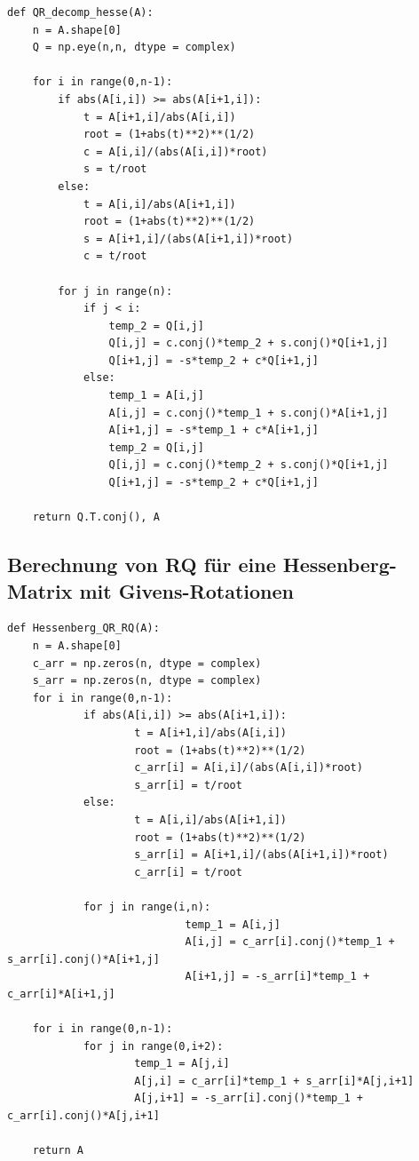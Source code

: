 \documentclass{article}
\theoremstyle{plain}
\begin{document}
\begin{lstlisting}
def QR_decomp_hesse(A):
    n = A.shape[0]
    Q = np.eye(n,n, dtype = complex)

    for i in range(0,n-1):
        if abs(A[i,i]) >= abs(A[i+1,i]):
            t = A[i+1,i]/abs(A[i,i])
            root = (1+abs(t)**2)**(1/2)
            c = A[i,i]/(abs(A[i,i])*root)
            s = t/root
        else:
            t = A[i,i]/abs(A[i+1,i])
            root = (1+abs(t)**2)**(1/2)
            s = A[i+1,i]/(abs(A[i+1,i])*root)
            c = t/root

        for j in range(n):
            if j < i:
                temp_2 = Q[i,j]
                Q[i,j] = c.conj()*temp_2 + s.conj()*Q[i+1,j]
                Q[i+1,j] = -s*temp_2 + c*Q[i+1,j]
            else:
                temp_1 = A[i,j]
                A[i,j] = c.conj()*temp_1 + s.conj()*A[i+1,j]
                A[i+1,j] = -s*temp_1 + c*A[i+1,j]
                temp_2 = Q[i,j]
                Q[i,j] = c.conj()*temp_2 + s.conj()*Q[i+1,j]
                Q[i+1,j] = -s*temp_2 + c*Q[i+1,j]

    return Q.T.conj(), A
\end{lstlisting}

\newpage
\subsection*{Berechnung von RQ für eine Hessenberg-Matrix mit Givens-Rotationen}

\begin{lstlisting}
def Hessenberg_QR_RQ(A):
	n = A.shape[0]
	c_arr = np.zeros(n, dtype = complex)
	s_arr = np.zeros(n, dtype = complex)
	for i in range(0,n-1):
			if abs(A[i,i]) >= abs(A[i+1,i]):
					t = A[i+1,i]/abs(A[i,i])
					root = (1+abs(t)**2)**(1/2)
					c_arr[i] = A[i,i]/(abs(A[i,i])*root)
					s_arr[i] = t/root
			else:
					t = A[i,i]/abs(A[i+1,i])
					root = (1+abs(t)**2)**(1/2)
					s_arr[i] = A[i+1,i]/(abs(A[i+1,i])*root)
					c_arr[i] = t/root

			for j in range(i,n):
							temp_1 = A[i,j]
							A[i,j] = c_arr[i].conj()*temp_1 + s_arr[i].conj()*A[i+1,j]
							A[i+1,j] = -s_arr[i]*temp_1 + c_arr[i]*A[i+1,j]

	for i in range(0,n-1):
			for j in range(0,i+2):
					temp_1 = A[j,i]
					A[j,i] = c_arr[i]*temp_1 + s_arr[i]*A[j,i+1]
					A[j,i+1] = -s_arr[i].conj()*temp_1 + c_arr[i].conj()*A[j,i+1]

	return A
\end{lstlisting}
\end{document}
